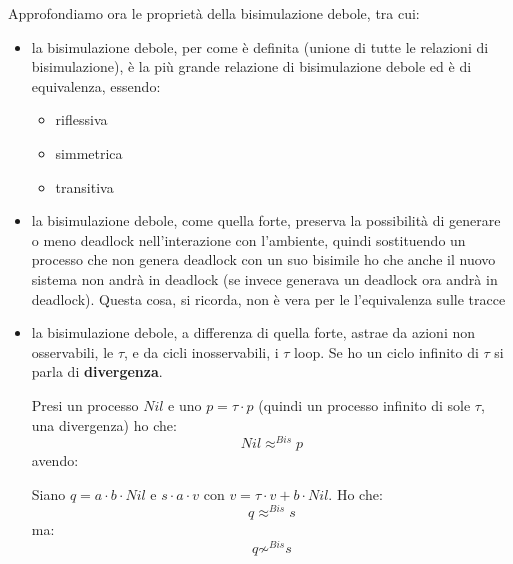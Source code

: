 \documentclass[a4paper,12pt, oneside]{book}
\begin{document}
Approfondiamo ora le proprietà della bisimulazione debole, tra cui:
\begin{itemize}
  \item la bisimulazione debole, per come è definita (unione di tutte le
  relazioni di bisimulazione), è la più grande relazione di bisimulazione debole
  ed è di equivalenza, essendo:
  \begin{itemize}
    \item riflessiva
    \item simmetrica
    \item transitiva
  \end{itemize}
  \item la bisimulazione debole, come quella forte, preserva la possibilità di
  generare o meno deadlock nell'interazione con l'ambiente, quindi sostituendo
  un processo che non genera deadlock con un suo bisimile ho che anche il nuovo
  sistema non andrà in deadlock (se invece generava un deadlock ora andrà
  in deadlock). Questa cosa, si ricorda, non è vera per le l'equivalenza sulle
  tracce
  
  \item la bisimulazione debole, a differenza di quella forte, astrae da azioni
  non osservabili, le $\tau$, e da cicli inosservabili, i $\tau$ loop. Se ho un
  ciclo infinito di $\tau$ si parla di \textbf{divergenza}.
  \begin{esempio}
    Presi un processo $Nil$ e uno $p=\tau\cdot p$ (quindi un processo infinito
    di sole $\tau$, una divergenza) ho che:
    \[Nil\approx^{Bis}p\]
    avendo:
    \begin{center}
    \end{center}
  \end{esempio}
  \begin{esempio}
    Siano $q=a\cdot b\cdot Nil$ e $s\cdot a\cdot v$ con $v=\tau\cdot v+b\cdot
    Nil$. Ho che:
    \[q\approx^{Bis} s\]
    ma:
    \[q\not\sim^{Bis} s\]


\end{esempio}
\end{itemize}
\end{document}

